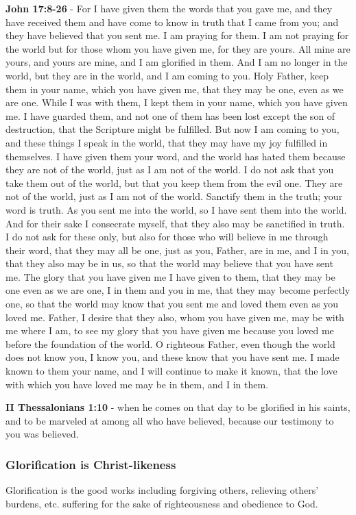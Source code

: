 \documentclass[11pt]{article}
\begin{document}
\textbf{John 17:8-26} - For I have given them the words that you gave me, and they have received them and have come to know in truth that I came from you; and they have believed that you sent me.  I am praying for them. I am not praying for the world but for those whom you have given me, for they are yours.  All mine are yours, and yours are mine, and I am glorified in them.  And I am no longer in the world, but they are in the world, and I am coming to you. Holy Father, keep them in your name, which you have given me, that they may be one, even as we are one.  While I was with them, I kept them in your name, which you have given me. I have guarded them, and not one of them has been lost except the son of destruction, that the Scripture might be fulfilled.  But now I am coming to you, and these things I speak in the world, that they may have my joy fulfilled in themselves.  I have given them your word, and the world has hated them because they are not of the world, just as I am not of the world.  I do not ask that you take them out of the world, but that you keep them from the evil one.  They are not of the world, just as I am not of the world.  Sanctify them in the truth; your word is truth.  As you sent me into the world, so I have sent them into the world.  And for their sake I consecrate myself, that they also may be sanctified in truth.  I do not ask for these only, but also for those who will believe in me through their word, that they may all be one, just as you, Father, are in me, and I in you, that they also may be in us, so that the world may believe that you have sent me.  The glory that you have given me I have given to them, that they may be one even as we are one, I in them and you in me, that they may become perfectly one, so that the world may know that you sent me and loved them even as you loved me.  Father, I desire that they also, whom you have given me, may be with me where I am, to see my glory that you have given me because you loved me before the foundation of the world.  O righteous Father, even though the world does not know you, I know you, and these know that you have sent me.  I made known to them your name, and I will continue to make it known, that the love with which you have loved me may be in them, and I in them.

\textbf{II Thessalonians 1:10} - when he comes on that day to be glorified in his saints, and to be marveled at among all who have believed, because our testimony to you was believed.

\subsubsection{Glorification is Christ-likeness}
\label{sec:orgff2291d}
Glorification is the good works including forgiving others, relieving others' burdens, etc. suffering for the sake of righteousness and obedience to God.
\end{document}
